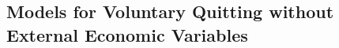 \documentclass[12pt,letterpaper]{article}
\begin{document}





\subsection{Models for Voluntary Quitting without External Economic Variables} \label{VQ:woE}

\end{document}
